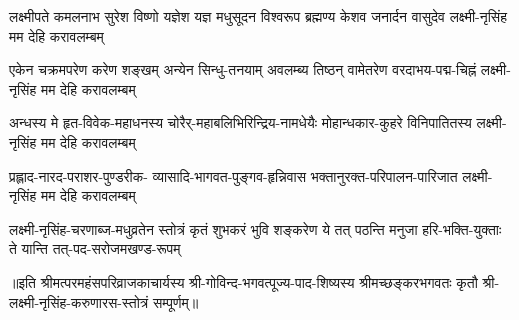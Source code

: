\fourlineindentedshloka
{लक्ष्मीपते कमलनाभ सुरेश विष्णो}
{यज्ञेश यज्ञ मधुसूदन विश्वरूप}
{ब्रह्मण्य केशव जनार्दन वासुदेव}
{लक्ष्मी-नृसिंह मम देहि करावलम्बम्}

\fourlineindentedshloka
{एकेन चक्रमपरेण करेण शङ्खम्}
{अन्येन सिन्धु-तनयाम् अवलम्ब्य तिष्ठन्}
{वामेतरेण वरदाभय-पद्म-चिह्नं}
{लक्ष्मी-नृसिंह मम देहि करावलम्बम्}

\fourlineindentedshloka
{अन्धस्य मे हृत-विवेक-महाधनस्य}
{चोरैर्-महाबलिभिरिन्द्रिय-नामधेयैः}
{मोहान्धकार-कुहरे विनिपातितस्य}
{लक्ष्मी-नृसिंह मम देहि करावलम्बम्}

\fourlineindentedshloka
{प्रह्लाद-नारद-पराशर-पुण्डरीक-}
{व्यासादि-भागवत-पुङ्गव-हृन्निवास}
{भक्तानुरक्त-परिपालन-पारिजात}
{लक्ष्मी-नृसिंह मम देहि करावलम्बम्}

\fourlineindentedshloka
{लक्ष्मी-नृसिंह-चरणाब्ज-मधुव्रतेन}
{स्तोत्रं कृतं शुभकरं भुवि शङ्करेण}
{ये तत् पठन्ति मनुजा हरि-भक्ति-युक्ताः}
{ते यान्ति तत्-पद-सरोजमखण्ड-रूपम्}


॥इति श्रीमत्परमहंसपरिव्राजकाचार्यस्य श्री-गोविन्द-भगवत्पूज्य-पाद-शिष्यस्य 
श्रीमच्छङ्करभगवतः कृतौ श्री-लक्ष्मी-नृसिंह-करुणारस-स्तोत्रं सम्पूर्णम्‌॥
